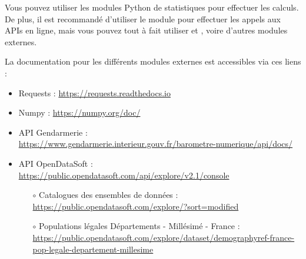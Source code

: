 

\vspace*{0.7cm}

\noindent {}

\noindent Vous pouvez utiliser les modules Python de statistiques pour effectuer les calculs.
De plus, il est recommandé d'utiliser le module  pour effectuer les appels aux APIs en ligne, mais vous pouvez tout à fait utiliser  et , voire d'autres modules externes.

\bigskip

\noindent La documentation pour les différents modules externes est accessibles via ces liens :

\begin{itemize}
\item Requests : \url{https://requests.readthedocs.io}

\item Numpy : \url{https://numpy.org/doc/}

\item API Gendarmerie : \\
\url{https://www.gendarmerie.interieur.gouv.fr/barometre-numerique/api/docs/}

\item API OpenDataSoft : \\
\url{https://public.opendatasoft.com/api/explore/v2.1/console}

  \begin{itemize}
  \item[$\circ$] Catalogues des ensembles de données : \\
  \url{https://public.opendatasoft.com/explore/?sort=modified}

  \item[$\circ$] Populations légales Départements - Millésimé - France : \\
  \url{https://public.opendatasoft.com/explore/dataset/demographyref-france-pop-legale-departement-millesime}
  \end{itemize}
\end{itemize}

